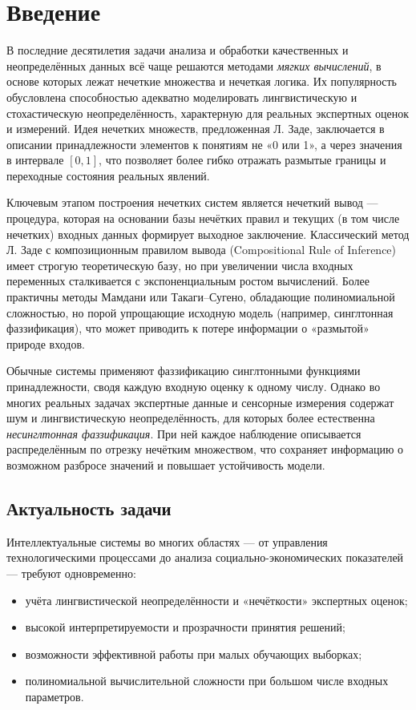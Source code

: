 \section{Введение}

В последние десятилетия задачи анализа и обработки качественных и неопределённых данных всё чаще решаются методами {\it мягких вычислений}, в основе которых лежат нечеткие множества и нечеткая логика. Их популярность обусловлена способностью адекватно моделировать лингвистическую и стохастическую неопределённость, характерную для реальных экспертных оценок и измерений. Идея нечетких множеств, предложенная Л. Заде, заключается в описании принадлежности элементов к понятиям не «0 или 1», а через значения в интервале $[0,1]$, что позволяет более гибко отражать размытые границы и переходные состояния реальных явлений.

Ключевым этапом построения нечетких систем является нечеткий вывод — процедура, которая на основании базы нечётких правил и текущих (в том числе нечетких) входных данных формирует выходное заключение. Классический метод Л. Заде с композиционным правилом вывода (Compositional Rule of Inference) имеет строгую теоретическую базу, но при увеличении числа входных переменных сталкивается с экспоненциальным ростом вычислений. Более практичны методы Мамдани или Такаги–Сугено, обладающие полиномиальной сложностью, но порой упрощающие исходную модель (например, синглтонная фаззификация), что может приводить к потере информации о «размытой» природе входов.

Обычные системы применяют фаззификацию синглтонными функциями принадлежности, сводя каждую входную оценку к одному числу. Однако во многих реальных задачах экспертные данные и сенсорные измерения содержат шум и лингвистическую неопределённость, для которых более естественна {\it несинглтонная фаззификация}. При ней каждое наблюдение описывается распределённым по отрезку нечётким множеством, что сохраняет информацию о возможном разбросе значений и повышает устойчивость модели.

\subsection{Актуальность задачи}

Интеллектуальные системы во многих областях — от управления технологическими процессами до анализа социально-экономических показателей — требуют одновременно:
\begin{itemize}
  \item учёта лингвистической неопределённости и «нечёткости» экспертных оценок;
  \item высокой интерпретируемости и прозрачности принятия решений;
  \item возможности эффективной работы при малых обучающих выборках;
  \item полиномиальной вычислительной сложности при большом числе входных параметров.
\end{itemize}

